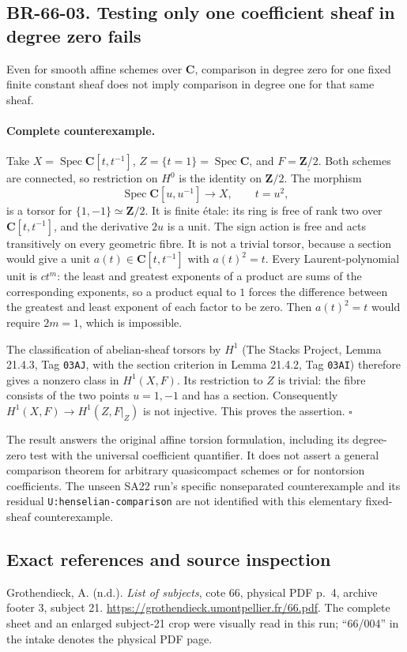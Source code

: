 \subsection{BR-66-03. Testing only one coefficient sheaf in degree zero fails}
Even for smooth affine schemes over $\mathbf C$, comparison in degree
zero for one fixed finite constant sheaf does not imply comparison
in degree one for that same sheaf.

\paragraph{Complete counterexample.}
Take $X=\operatorname{Spec}\mathbf C[t,t^{-1}]$,
$Z=\{t=1\}=\operatorname{Spec}\mathbf C$, and
$F=\underline{\mathbf Z/2}$. Both schemes are connected, so
restriction on $H^0$ is the identity on $\mathbf Z/2$.
The morphism
\[
 \operatorname{Spec}\mathbf C[u,u^{-1}]\longrightarrow X,
 \qquad t=u^2,
\]
is a torsor for $\{1,-1\}\simeq\mathbf Z/2$. It is finite \'etale:
its ring is free of rank two over $\mathbf C[t,t^{-1}]$, and the
derivative $2u$ is a unit. The sign action is free and acts transitively
on every geometric fibre. It is not a trivial torsor, because a section
would give a unit $a(t)\in\mathbf C[t,t^{-1}]$ with $a(t)^2=t$.
Every Laurent-polynomial unit is $ct^m$: the least and greatest
exponents of a product are sums of the corresponding exponents,
so a product equal to $1$ forces the difference between the greatest
and least exponent of each factor to be zero. Then $a(t)^2=t$
would require $2m=1$, which is impossible.

The classification of abelian-sheaf torsors by $H^1$ (The Stacks
Project, Lemma 21.4.3, Tag \texttt{03AJ}, with the section criterion
in Lemma 21.4.2, Tag \texttt{03AI}) therefore gives
a nonzero class in $H^1(X,F)$. Its restriction to $Z$ is trivial:
the fibre consists of the two points $u=1,-1$ and has a section.
Consequently $H^1(X,F)\to H^1(Z,F|_Z)$ is not injective.
This proves the assertion. \(\square\)

The result answers the original affine torsion formulation, including
its degree-zero test with the universal coefficient quantifier.
It does not assert a general comparison theorem for arbitrary
quasicompact schemes or for nontorsion coefficients. The unseen
SA22 run's specific nonseparated counterexample and its residual
\texttt{U:henselian-comparison} are not identified with this elementary
fixed-sheaf counterexample.

\subsection*{Exact references and source inspection}
Grothendieck, A. (n.d.). \emph{List of subjects}, cote 66,
physical PDF p.~4, archive footer 3, subject 21.
\url{https://grothendieck.umontpellier.fr/66.pdf}.
The complete sheet and an enlarged subject-21 crop were visually read
in this run; ``66/004'' in the intake denotes the physical PDF page.

